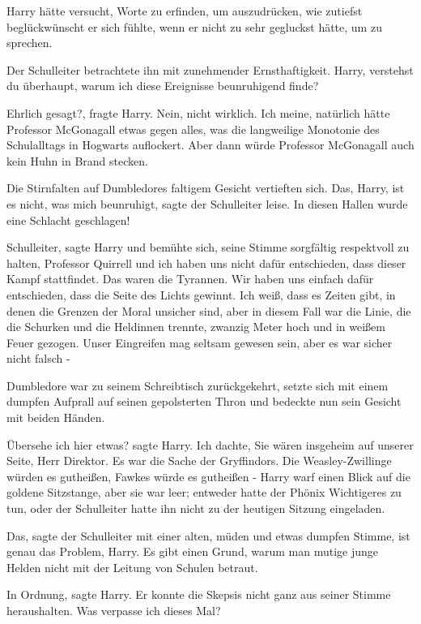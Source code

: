 Harry hätte versucht, Worte zu erfinden, um auszudrücken, wie zutiefst
beglückwünscht er sich fühlte, wenn er nicht zu sehr gegluckst hätte, um zu
sprechen.

Der Schulleiter betrachtete ihn mit zunehmender Ernsthaftigkeit. \glqq{}Harry,
verstehst du überhaupt, warum ich diese Ereignisse beunruhigend finde?\grqq{}

\glqq{}Ehrlich gesagt?\grqq{}, fragte Harry. \glqq{}Nein, nicht wirklich. Ich
meine, natürlich hätte Professor McGonagall etwas gegen alles, was die
langweilige Monotonie des Schulalltags in Hogwarts auflockert. Aber dann würde
Professor McGonagall auch kein Huhn in Brand stecken.\grqq{}

Die Stirnfalten auf Dumbledores faltigem Gesicht vertieften sich. \glqq{}Das,
Harry, ist es nicht, was mich beunruhigt\grqq{}, sagte der Schulleiter leise.
\glqq{}In diesen Hallen wurde eine Schlacht geschlagen!\grqq{}

\glqq{}Schulleiter\grqq{}, sagte Harry und bemühte sich, seine Stimme sorgfältig
respektvoll zu halten, \glqq{}Professor Quirrell und ich haben uns nicht dafür
entschieden, dass dieser Kampf stattfindet. Das waren die Tyrannen. Wir haben
uns einfach dafür entschieden, dass die Seite des Lichts gewinnt. Ich weiß, dass
es Zeiten gibt, in denen die Grenzen der Moral unsicher sind, aber in diesem
Fall war die Linie, die die Schurken und die Heldinnen trennte, zwanzig Meter
hoch und in weißem Feuer gezogen. Unser Eingreifen mag seltsam gewesen sein,
aber es war sicher nicht falsch -\grqq{}

Dumbledore war zu seinem Schreibtisch zurückgekehrt, setzte sich mit einem
dumpfen Aufprall auf seinen gepolsterten Thron und bedeckte nun sein Gesicht mit
beiden Händen.

\glqq{}Übersehe ich hier etwas?\grqq{} sagte Harry. \glqq{}Ich dachte, Sie wären
insgeheim auf unserer Seite, Herr Direktor. Es war die Sache der Gryffindors.
Die Weasley-Zwillinge würden es gutheißen, Fawkes würde es gutheißen -\grqq{}
Harry warf einen Blick auf die goldene Sitzstange, aber sie war leer; entweder
hatte der Phönix Wichtigeres zu tun, oder der Schulleiter hatte ihn nicht zu der
heutigen Sitzung eingeladen.

\glqq{}Das\grqq{}, sagte der Schulleiter mit einer alten, müden und etwas dumpfen
Stimme, \glqq{}ist genau das Problem, Harry. Es gibt einen Grund, warum man
mutige junge Helden nicht mit der Leitung von Schulen betraut.\grqq{}

\glqq{}In Ordnung\grqq{}, sagte Harry. Er konnte die Skepsis nicht ganz aus
seiner Stimme heraushalten. \glqq{}Was verpasse ich dieses Mal?\grqq{}

